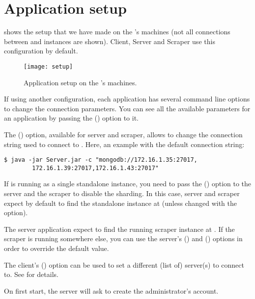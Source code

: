 \chapter{Application setup}\label{appendix:setup}

 shows the setup that we have made on the \theinstitute's
machines (not all connections between  and  instances
are shown). Client, Server and Scraper use this configuration by default.

\begin{figure}[htb]
	\texttt{[image: setup]}
	\caption{Application setup on the \theinstitute's
	machines.}\label{fig:setup}
\end{figure}

If using another configuration, each application has several command line
options to change the connection parameters. You can see all the available
parameters for an application by passing the  () option to
it.

The  () option, available for server and
scraper, allows to change the connection string used to connect to \mongodb.
Here, an example with the default connection string:
\begin{verbatim}
$ java -jar Server.jar -c "mongodb://172.16.1.35:27017,
        172.16.1.39:27017,172.16.1.43:27017"
\end{verbatim}

If \mongodb{} is running as a single standalone instance, you need to pass the
 () option to the server and the scraper to disable
the sharding. In this case, server and scraper expect by default to find the
standalone  instance at  (unless changed with
the  option).

The server application expect to find the running scraper instance at
. If the scraper is running somewhere else, you can use
the server's  () and 
() options in order to override the default value.

The client's  () option can be used to set a different
(list of) server(s) to connect to. See  for details.

On first start, the server will ask to create the administrator's account.
